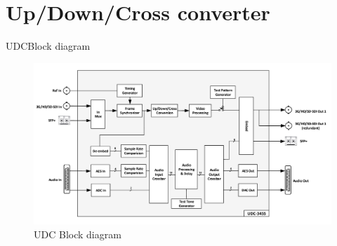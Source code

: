 \section{Up/Down/Cross converter}
\begin{frame}{UDC}{Block diagram}
	\begin{figure}
		\centering
		\includegraphics[scale=1]{graphics/udc_block_diagram.png}
		\caption{UDC Block diagram}
	\end{figure}
\end{frame}



